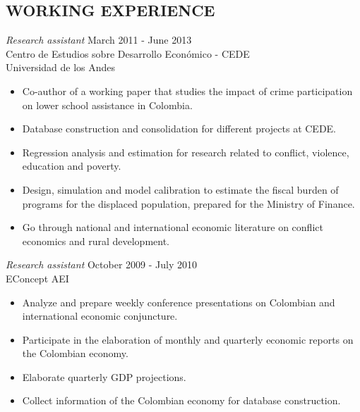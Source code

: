 \documentclass{res}
\begin{document}
\begin{resume}
\section{WORKING EXPERIENCE} 

								{\sl Research assistant} \hfill March 2011 - June 2013\\
								Centro de Estudios sobre Desarrollo Econ\'omico - CEDE\\
								Universidad de los Andes\\
								
								\begin{itemize}
									\item Co-author of a working paper that studies the impact of crime participation on lower school assistance in Colombia. 
									\item Database construction and consolidation for different projects at CEDE. 
									\item Regression analysis and estimation for research related to conflict, violence, education and poverty.
									\item Design, simulation and model calibration to estimate the fiscal burden of programs for the displaced population, prepared for the Ministry of Finance.
									\item Go through national and international economic literature on conflict economics and rural development.
									 								
								\end{itemize}
								{\sl Research assistant} \hfill October 2009 									- July 2010\\
								EConcept AEI\\

								\begin{itemize}
								
									\item Analyze and prepare weekly conference presentations on Colombian and international economic conjuncture.
									 
									\item Participate in the elaboration of monthly and quarterly economic reports on the Colombian economy.
									
									\item Elaborate quarterly GDP projections.
									
									\item Collect information of the Colombian economy for database construction.
																								

\end{itemize}
\end{resume}
\end{document}
